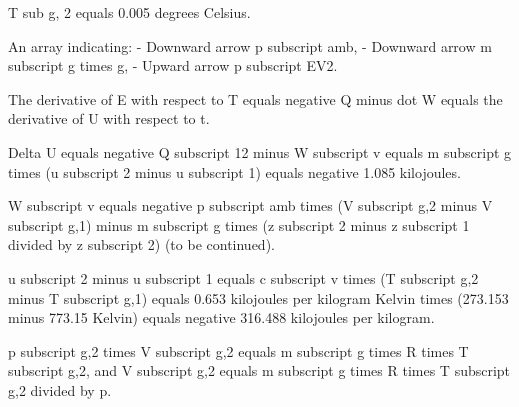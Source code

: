 T sub g, 2 equals 0.005 degrees Celsius.

An array indicating:
- Downward arrow p subscript amb,
- Downward arrow m subscript g times g,
- Upward arrow p subscript EV2.

The derivative of E with respect to T equals negative Q minus dot W equals the derivative of U with respect to t.

Delta U equals negative Q subscript 12 minus W subscript v equals m subscript g times (u subscript 2 minus u subscript 1) equals negative 1.085 kilojoules.

W subscript v equals negative p subscript amb times (V subscript g,2 minus V subscript g,1) minus m subscript g times (z subscript 2 minus z subscript 1 divided by z subscript 2) (to be continued).

u subscript 2 minus u subscript 1 equals c subscript v times (T subscript g,2 minus T subscript g,1) equals 0.653 kilojoules per kilogram Kelvin times (273.153 minus 773.15 Kelvin) equals negative 316.488 kilojoules per kilogram.

p subscript g,2 times V subscript g,2 equals m subscript g times R times T subscript g,2, and V subscript g,2 equals m subscript g times R times T subscript g,2 divided by p.